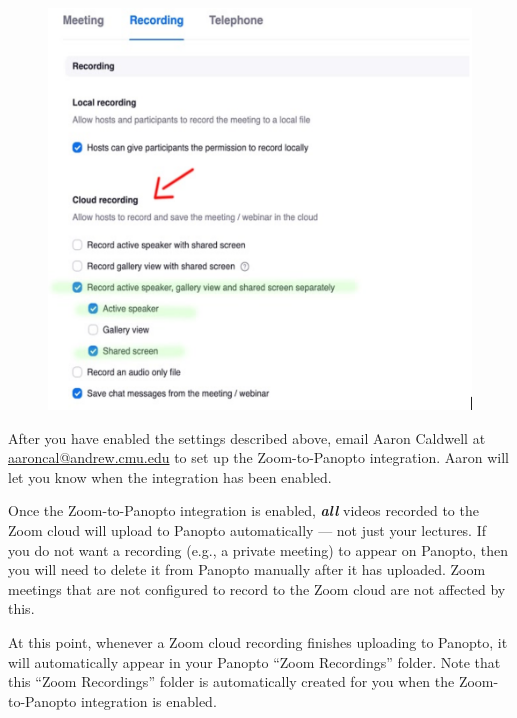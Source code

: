 \begin{gram}[Step 1/2]
	\begin{figure}[H]
		\centering
		\includegraphics[scale=0.5]{panopto/04-settings.png}
	\end{figure}
\end{gram}

\begin{gram}[Step 2/2]
	After you have enabled the settings described above, email Aaron Caldwell at \href{mailto:aaroncal@andrew.cmu.edu?subject=Zoom-to-Panopto}{aaroncal@andrew.cmu.edu} to set up the Zoom-to-Panopto integration. Aaron will let you know when the integration has been enabled.
\end{gram}

\begin{important}
	Once the Zoom-to-Panopto integration is enabled, \emph{\textbf{all}} videos recorded to the Zoom cloud will upload to Panopto automatically --- not just your lectures. If you do not want a recording (e.g., a private meeting) to appear on Panopto, then you will need to delete it from Panopto manually after it has uploaded. Zoom meetings that are not configured to record to the Zoom cloud are not affected by this.
\end{important}

\begin{gram}
 	At this point, whenever a Zoom cloud recording finishes uploading to Panopto, it will automatically appear in your Panopto ``Zoom Recordings'' folder. Note that this ``Zoom Recordings'' folder is automatically created for you when the Zoom-to-Panopto integration is enabled.
\end{gram}

